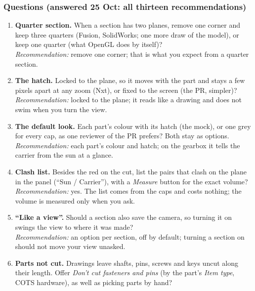 \subsubsection*{Questions (answered 25 Oct: all thirteen recommendations)}

\begin{enumerate}
  \item \textbf{Quarter section.} When a section has two planes, remove one corner and keep three quarters (Fusion,
        SolidWorks; one more draw of the model), or keep one quarter (what OpenGL does by itself)?\\
        \emph{Recommendation:} remove one corner; that is what you expect from a quarter section.
  \item \textbf{The hatch.} Locked to the plane, so it moves with the part and stays a few pixels apart at any zoom
        (Nxt), or fixed to the screen (the PR, simpler)?\\
        \emph{Recommendation:} locked to the plane; it reads like a drawing and does not swim when you turn the view.
  \item \textbf{The default look.} Each part's colour with its hatch (the mock), or one grey for every cap, as one
        reviewer of the PR prefers? Both stay as options.\\
        \emph{Recommendation:} each part's colour and hatch; on the gearbox it tells the carrier from the sun at a
        glance.
  \item \textbf{Clash list.} Besides the red on the cut, list the pairs that clash on the plane in the panel (``Sun /
        Carrier''), with a \emph{Measure} button for the exact volume?\\
        \emph{Recommendation:} yes. The list comes from the caps and costs nothing; the volume is measured only when
        you ask.
  \item \textbf{``Like a view''.} Should a section also save the camera, so turning it on swings the view to where it
        was made?\\
        \emph{Recommendation:} an option per section, off by default; turning a section on should not move your view
        unasked.
  \item \textbf{Parts not cut.} Drawings leave shafts, pins, screws and keys uncut along their length. Offer \emph{Don't
        cut fasteners and pins} (by the part's \emph{Item type}, COTS hardware), as well as picking parts by hand?\\

\end{enumerate}
